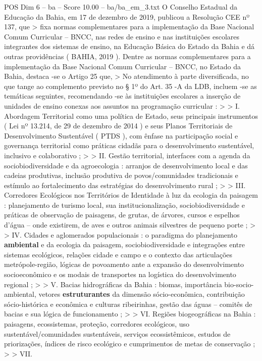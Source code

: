 \begin{textsample}{POS Dim 6 – ba – Score 10.00 – ba/ba\_em\_3.txt}
O Conselho Estadual da Educação da Bahia, em 17 de dezembro de 2019, publicou a Resolução CEE nº 137, que > fixa normas complementares para a implementação da Base Nacional Comum Curricular – BNCC, nas redes de ensino e nas instituições escolares integrantes dos sistemas de ensino, na Educação Básica do Estado da Bahia e dá outras providências ( BAHIA, 2019 ).
Dentre as normas complementares para a implementação da Base Nacional Comum Curricular – BNCC, no Estado da Bahia, destaca -se o Artigo 25 que, > No atendimento à parte diversificada, no que tange ao complemento previsto no § 1º do Art. 35 -A da LDB, incluem -se as temáticas seguintes, recomendando -se às instituições escolares a inserção de unidades de ensino conexas aos assuntos na programação curricular : > > I.
Abordagem Territorial como uma política de Estado, seus principais instrumentos ( Lei nº 13.214, de 29 de dezembro de 2014 ) e seus Planos Territoriais de Desenvolvimento Sustentável ( PTDS ), com ênfase na participação social e governança territorial como práticas cidadãs para o desenvolvimento sustentável, inclusivo e colaborativo ; > > II.
Gestão territorial, interfaces com a agenda da sociobiodiversidade e da agroecologia : arranjos de desenvolvimento local e das cadeias produtivas, inclusão produtiva de povos/comunidades tradicionais e estímulo ao fortalecimento das estratégias do desenvolvimento rural ; > > III.
Corredores Ecológicos nos Territórios de Identidade à luz da ecologia da paisagem : planejamento de turismo local, sua institucionalização, sociobiodiversidade e práticas de observação de paisagens, de grutas, de árvores, cursos e espelhos d’água – onde existirem, de aves e outros animais silvestres de pequeno porte ; > > IV.
Cidades e aglomerados populacionais : o paradigma do planejamento \textbf{ambiental} e da ecologia da paisagem, sociobiodiversidade e integrações entre sistemas ecológicos, relações cidade e campo e o contexto das articulações metrópole-região, lógicas de povoamento ante a expansão do desenvolvimento socioeconômico e os modais de transportes na logística do desenvolvimento regional ; > > V.
Bacias hidrográficas da Bahia : biomas, importância bio-socio-ambiental, vetores \textbf{estruturantes} da dimensão sócio-econômica, contribuição sócio-histórica e econômica e culturas ribeirinhas, gestão das águas – comitês de bacias e sua lógica de funcionamento ; > > VI.
Regiões biogeográficas na Bahia : paisagens, ecossistemas, proteção, corredores ecológicos, uso sustentável/comunidades sustentáveis, serviços ecossistêmicos, estudos de priorizações, índices de risco ecológico e cumprimentos de metas de conservação ; > > VII.

\end{textsample}
